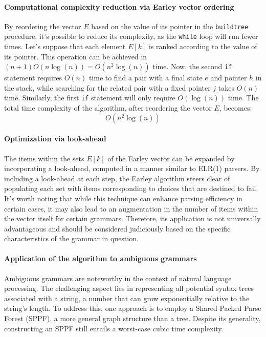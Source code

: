 \paragraph*{Computational complexity reduction via Earley vector ordering}
By reordering the vector $E$ based on the value of its pointer in the \texttt{buildtree} procedure, it's possible to reduce its complexity, as the \texttt{while} loop will run fewer times. 
Let's suppose that each element $E[k]$ is ranked according to the value of its pointer. This operation can be achieved in $(n+1) O\left( n \log{(n)} \right) = O\left( n^2 \log{(n)} \right)$ time.
Now, the second \texttt{if} statement requires $O(n)$ time to find a pair with a final state $e$ and pointer $h$ in the stack, while searching for the related pair with a fixed pointer $j$ takes $O(n)$ time. 
Similarly, the first \texttt{if} statement will only require $O\left( \log{(n)} \right)$ time.
The total time complexity of the algorithm, after reordering the vector $E$, becomes:
\[ O\left( n^2 \log{(n)} \right)\]

\paragraph*{Optimization via look-ahead}
The items within the sets $E[k]$ of the Earley vector can be expanded by incorporating a look-ahead, computed in a manner similar to ELR(1) parsers. 
By including a look-ahead at each step, the Earley algorithm steers clear of populating each set with items corresponding to choices that are destined to fail.
It's worth noting that while this technique can enhance parsing efficiency in certain cases, it may also lead to an augmentation in the number of items within the vector itself for certain grammars. 
Therefore, its application is not universally advantageous and should be considered judiciously based on the specific characteristics of the grammar in question.

\paragraph*{Application of the algorithm to ambiguous grammars}
Ambiguous grammars are noteworthy in the context of natural language processing. 
The challenging aspect lies in representing all potential syntax trees associated with a string, a number that can grow exponentially relative to the string's length. 
To address this, one approach is to employ a Shared Packed Parse Forest (SPPF), a more general graph structure than a tree. 
Despite its generality, constructing an SPPF still entails a worst-case cubic time complexity.
